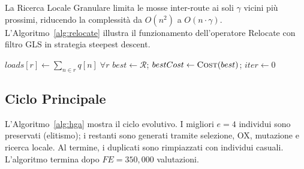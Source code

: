 La Ricerca Locale Granulare limita le mosse inter-route ai soli $\gamma$ vicini
pi\`u prossimi, riducendo la complessit\`a da $O(n^2)$ a $O(n \cdot \gamma)$.
L'Algoritmo~\ref{alg:relocate} illustra il funzionamento dell'operatore Relocate
con filtro GLS in strategia steepest descent.

\begin{algorithm}[H]
\scriptsize
\caption{Relocate con GLS (steepest descent)}
\label{alg:relocate}

$loads[r] \gets \sum_{n \in r} q[n] \; \forall r$\;
$best \gets \mathcal{R}$; $bestCost \gets \textsc{Cost}(best)$; $iter \gets 0$\;

\;
\end{algorithm}

\subsection{Ciclo Principale}

L'Algoritmo~\ref{alg:hga} mostra il ciclo evolutivo. I migliori $e=4$ individui
sono preservati (elitismo); i restanti sono generati tramite selezione, OX,
mutazione e ricerca locale. Al termine, i duplicati sono rimpiazzati con individui
casuali. L'algoritmo termina dopo $FE = 350{,}000$ valutazioni.

